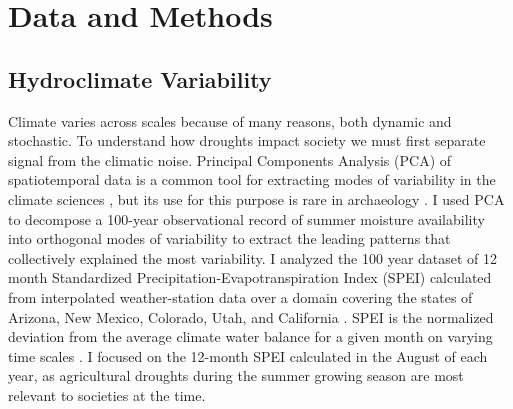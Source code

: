 \documentclass[11pt]{iopart}
\begin{document}

\section*{Data and Methods}

\subsection*{Hydroclimate Variability}

Climate varies across scales because of many reasons, both dynamic and stochastic. To understand how droughts impact society we must first separate signal from the climatic noise. Principal Components Analysis (PCA) of spatiotemporal data is a common tool for extracting modes of variability in the climate sciences \parencite{Lorenz1956,Hannachi2007}, but its use for this purpose is rare in archaeology \parencite{Weiss1982, Cordell2007}. I used PCA to decompose a 100-year observational record of summer moisture availability into orthogonal modes of variability to extract the leading patterns that collectively explained the most variability. I analyzed the 100 year dataset of 12 month Standardized Precipitation-Evapotranspiration Index (SPEI) calculated from interpolated weather-station data over a domain covering the states of Arizona, New Mexico, Colorado, Utah, and California \parencite{Daly1997}. SPEI is the normalized deviation from the average climate water balance for a given month on varying time scales \parencite{Vicente-Serrano2010}. I focused on the 12-month SPEI calculated in the August of each year, as agricultural droughts during the summer growing season are most relevant to societies at the time.
\end{document}
